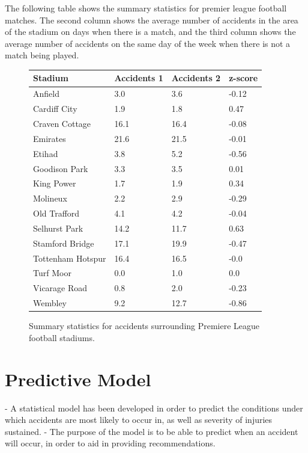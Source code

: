 \documentclass[12pt]{article}
\begin{document}
The following table shows the summary statistics for premier league football matches. The second column shows the average number of accidents in the area of the stadium on days when there is a match, and the third column shows the average number of accidents on the same day of the week when there is not a match being played.


\begin{figure}
    \centering
    \begin{tabular}{|l|l|l|l|}
    \hline
        Stadium & Accidents 1 & Accidents 2 & z-score \\ \hline
        Anfield & 3.0 & 3.6 & -0.12 \\ \hline
        Cardiff City & 1.9 & 1.8 & 0.47 \\ \hline
        Craven Cottage & 16.1 & 16.4 & -0.08 \\ \hline
        Emirates & 21.6 & 21.5 & -0.01 \\ \hline
        Etihad & 3.8 & 5.2 & -0.56 \\ \hline
        Goodison Park & 3.3 & 3.5 & 0.01 \\ \hline
        King Power & 1.7 & 1.9 & 0.34 \\ \hline
        Molineux & 2.2 & 2.9 & -0.29 \\ \hline
        Old Trafford & 4.1 & 4.2 & -0.04 \\ \hline
        Selhurst Park & 14.2 & 11.7 & 0.63 \\ \hline
        Stamford Bridge & 17.1 & 19.9 & -0.47 \\ \hline
        Tottenham Hotspur & 16.4 & 16.5 & -0.0 \\ \hline
        Turf Moor & 0.0 & 1.0 & 0.0 \\ \hline
        Vicarage Road & 0.8 & 2.0 & -0.23 \\ \hline
        Wembley & 9.2 & 12.7 & -0.86 \\ \hline
    \end{tabular}
    \caption{Summary statistics for accidents surrounding Premiere League football stadiums.}
\end{figure}


\section{Predictive Model}


- A statistical model has been developed in order to predict the conditions under which accidents are most likely to occur in, as well as severity of injuries sustained.
- The purpose of the model is to be able to predict when an accident will occur, in order to aid in providing recommendations.
\end{document}
